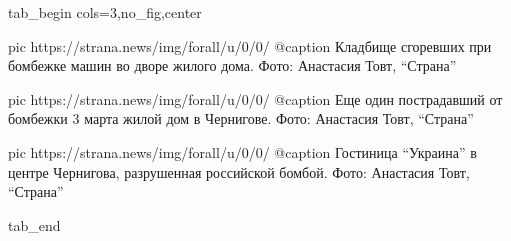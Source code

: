  
 
 
 
 


\ifcmt
  tab_begin cols=3,no_fig,center

     pic https://strana.news/img/forall/u/0/0/%
		 @caption Кладбище сгоревших при бомбежке машин во дворе жилого дома. Фото: Анастасия Товт, \enquote{Страна}

		 pic https://strana.news/img/forall/u/0/0/%
		 @caption Еще один пострадавший от бомбежки 3 марта жилой дом в Чернигове. Фото: Анастасия Товт, \enquote{Страна}

		 pic https://strana.news/img/forall/u/0/0/%
		 @caption Гостиница \enquote{Украина} в центре Чернигова, разрушенная российской бомбой. Фото: Анастасия Товт, \enquote{Страна}

  tab_end
\fi
